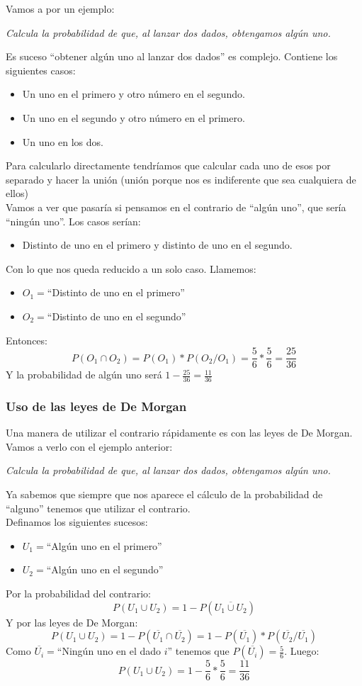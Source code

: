 \documentclass[a4paper,10pt,answers]{exam}
\begin{document}
Vamos a por un ejemplo:
\begin{questions}
\question\emph{Calcula la probabilidad de que, al lanzar dos dados, obtengamos algún uno.}
\begin{solution}
Es suceso ``obtener algún uno al lanzar dos dados'' es complejo. Contiene los siguientes casos:
\begin{itemize}
	\item Un uno en el primero y otro número en el segundo.
	\item Un uno en el segundo y otro número en el primero.
	\item Un uno en los dos.
\end{itemize}
Para calcularlo directamente tendríamos que calcular cada uno de esos por separado y hacer la unión (unión porque nos es indiferente que sea cualquiera de ellos)\\
Vamos a ver que pasaría si  pensamos en el contrario de ``algún uno'', que sería ``ningún uno''. Los casos serían:
\begin{itemize}
	\item Distinto de uno en el primero y distinto de uno en el segundo.
\end{itemize}
Con lo que nos queda reducido a un solo caso. Llamemos:
\begin{itemize}
	\item $O_1 = $``Distinto de uno en el primero''
	\item $O_2=$``Distinto de uno en el segundo''
\end{itemize}
Entonces:
\[P(O_1 \cap O_2 ) = P(O_1) * P(O_2 / O_1) = \frac{5}{6} * \frac{5}{6} = \frac{25}{36}\]
Y la probabilidad de algún uno será $1 - \frac{25}{36} = \frac{11}{36}$
\end{solution}
\end{questions}
\subsubsection{Uso de las leyes de De Morgan}
Una manera de utilizar el contrario rápidamente es con las leyes de De Morgan. Vamos a verlo con el ejemplo anterior:
\begin{questions}
\question\emph{Calcula la probabilidad de que, al lanzar dos dados, obtengamos algún uno.}
\begin{solution}
Ya sabemos que siempre que nos aparece el cálculo de la probabilidad de ``alguno'' tenemos que utilizar el contrario.\\
Definamos los siguientes sucesos:
\begin{itemize}
	\item $U_1=$``Algún uno en el primero''
	\item $U_2=$``Algún uno en el segundo''
\end{itemize}
Por la probabilidad del contrario:
\[P(U_1 \cup U_2) = 1- P(\overline{U_1 \cup U_2})\]
Y por las leyes de De Morgan:
\[P(U_1 \cup U_2) = 1- P(\overline{U_1} \cap \overline{U_2}) = 1 - P(\overline{U_1}) * P(\overline{U_2}/\overline{U_1})\]
Como $\overline{U_i}=$``Ningún uno en el dado $i$'' tenemos que $P(\overline{U_i}) = \frac{5}{6}$. Luego:
\[P(U_1 \cup U_2) = 1-\frac{5}{6} * \frac{5}{6} = \frac{11}{36}\]
\end{solution}
\end{questions}
\end{document}
